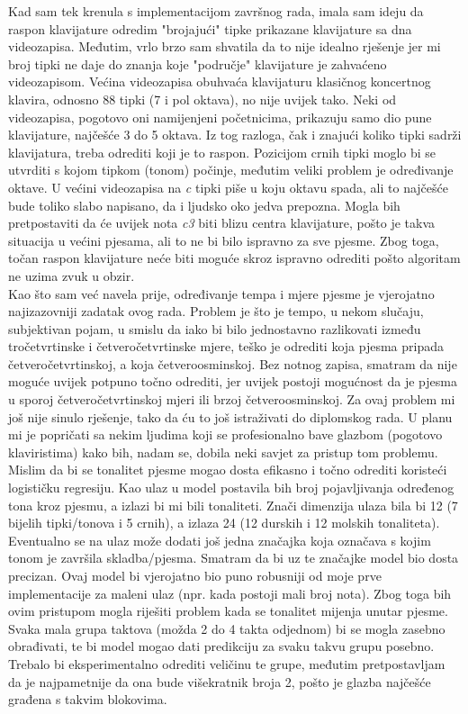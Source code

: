 \documentclass[times, utf8, seminar, numeric]{fer}
\begin{document}
Kad sam tek krenula s implementacijom završnog rada, imala sam ideju da raspon klavijature odredim "brojajući" tipke prikazane klavijature sa dna videozapisa. Međutim, vrlo brzo sam shvatila da to nije idealno rješenje jer mi broj tipki ne daje do znanja koje "područje" klavijature je zahvaćeno videozapisom. Većina videozapisa obuhvaća klavijaturu klasičnog koncertnog klavira, odnosno 88 tipki (7 i pol oktava), no nije uvijek tako. Neki od videozapisa, pogotovo oni namijenjeni početnicima, prikazuju samo dio pune klavijature, najčešće 3 do 5 oktava. Iz tog razloga, čak i znajući koliko tipki sadrži klavijatura, treba odrediti koji je to raspon. Pozicijom crnih tipki moglo bi se utvrditi s kojom tipkom (tonom) počinje, međutim veliki problem je određivanje oktave. U većini videozapisa na \textit{c} tipki piše u koju oktavu spada, ali to najčešće bude toliko slabo napisano, da i ljudsko oko jedva prepozna. Mogla bih pretpostaviti da će uvijek nota \textit{c3} biti blizu centra klavijature, pošto je takva situacija u većini pjesama, ali to ne bi bilo ispravno za sve pjesme. Zbog toga, točan raspon klavijature neće biti moguće skroz ispravno odrediti pošto algoritam ne uzima zvuk u obzir.\\

Kao što sam već navela prije, određivanje tempa i mjere pjesme je vjerojatno najizazovniji zadatak ovog rada. Problem je što je tempo, u nekom slučaju, subjektivan pojam, u smislu da iako bi bilo jednostavno razlikovati između tročetvrtinske i četveročetvrtinske mjere, teško je odrediti koja pjesma pripada četveročetvrtinskoj, a koja četveroosminskoj. Bez notnog zapisa, smatram da nije moguće uvijek potpuno točno odrediti, jer uvijek postoji mogućnost da je pjesma u sporoj četveročetvrtinskoj mjeri ili brzoj četveroosminskoj. Za ovaj problem mi još nije sinulo rješenje, tako da ću to još istraživati do diplomskog rada. U planu mi je popričati sa nekim ljudima koji se profesionalno bave glazbom (pogotovo klaviristima) kako bih, nadam se, dobila neki savjet za pristup tom problemu.\\

Mislim da bi se tonalitet pjesme mogao dosta efikasno i točno odrediti koristeći logističku regresiju. Kao ulaz u model postavila bih broj pojavljivanja određenog tona kroz pjesmu, a izlazi bi mi bili tonaliteti. Znači dimenzija ulaza bila bi 12 (7 bijelih tipki/tonova i 5 crnih), a izlaza 24 (12 durskih i 12 molskih tonaliteta). Eventualno se na ulaz može dodati još jedna značajka koja označava s kojim tonom je završila skladba/pjesma. Smatram da bi uz te značajke model bio dosta precizan. Ovaj model bi vjerojatno bio puno robusniji od moje prve implementacije za maleni ulaz (npr. kada postoji mali broj nota). Zbog toga bih ovim pristupom mogla riješiti problem kada se tonalitet mijenja unutar pjesme. Svaka mala grupa taktova (možda 2 do 4 takta odjednom) bi se mogla zasebno obrađivati, te bi model mogao dati predikciju za svaku takvu grupu posebno. Trebalo bi eksperimentalno odrediti veličinu te grupe, međutim pretpostavljam da je najpametnije da ona bude višekratnik broja 2, pošto je glazba najčešće građena s takvim blokovima.\\
\end{document}
